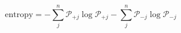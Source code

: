 \begin{equation}
\text{entropy} = -\sum_j^n\mathcal P_{+j}\log\mathcal P_{+j} -\sum_j^n\mathcal P_{-j}\log\mathcal P_{-j} 
\end{equation}